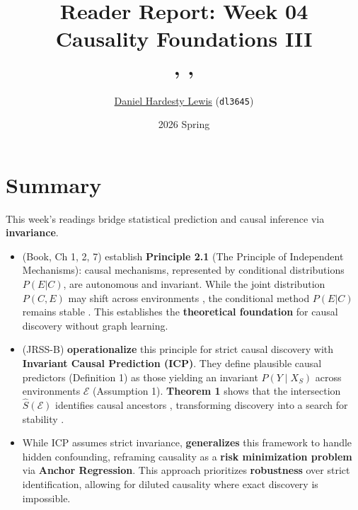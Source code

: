 \documentclass[11pt]{article}
\title{\vspace{-2.5em}\textbf{Reader Report: Week 04} \\ \vspace{0.1em} \large Causality Foundations III \\ \footnotesize \textcite{peters2018}, \textcite{peters2016}, \textcite{buhlmann2020}}
\author{\href{https://github.com/dhardestylewis}{Daniel Hardesty Lewis} (\texttt{dl3645})}
\date{2026 Spring}
\begin{document}
\maketitle
\thispagestyle{fancy}
\vspace{-1em}

\section*{Summary}
This week's readings bridge statistical prediction and causal inference via \textbf{invariance}.
\begin{itemize}
    \item \textbf{\textcite{peters2018}} (Book, Ch 1, 2, 7) establish \textbf{Principle 2.1} (The Principle of Independent Mechanisms): causal mechanisms, represented by conditional distributions $P(E|C)$, are autonomous and invariant.
    While the joint distribution $P(C, E)$ may shift across environments \autocite{peters2016},
    the conditional method $P(E|C)$ remains stable \autocite{peters2018}.
    This establishes the \textbf{theoretical foundation} for causal discovery without graph learning.
    \item \textbf{\textcite{peters2016}} (JRSS-B) \textbf{operationalize} this principle for strict causal discovery with \textbf{Invariant Causal Prediction (ICP)}.
    They define plausible causal predictors (Definition 1) as those yielding an invariant $P(Y \mid X_S)$ across environments $\mathcal{E}$ (Assumption 1).
    \textbf{Theorem 1} shows that the intersection $\hat{S}(\mathcal{E})$ identifies causal ancestors \autocite{peters2016}, transforming discovery into a search for stability \autocite{buhlmann2020}.
    \item While ICP assumes strict invariance, \textbf{\textcite{buhlmann2020}} \textbf{generalizes} this framework to handle hidden confounding, reframing causality as a \textbf{risk minimization problem} via \textbf{Anchor Regression}. This approach prioritizes \textbf{robustness} \autocite{buhlmann2020}
    over strict identification, allowing for diluted causality \autocite[Sec.~4.3.2]{buhlmann2020}
    where exact discovery is impossible.
\end{itemize}
\end{document}
